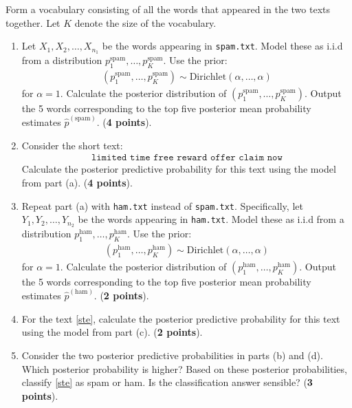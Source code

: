 \documentclass{scrartcl}
\begin{document}
\begin{enumerate}
  Form a vocabulary consisting of all the words that appeared in the
  two texts together. Let $K$ denote the size of the vocabulary. 

  \begin{enumerate}
  \item Let $X_1, X_2, \dots, X_{n_1}$ be the words appearing in
    \texttt{spam.txt}. Model these as i.i.d from a distribution
    $p^{\text{spam}}_1, \dots, p_{K}^{\text{spam}}$. Use the prior:
    \begin{align*}
      (p^{\text{spam}}_1, \dots, p_{K}^{\text{spam}}) \sim
      \text{Dirichlet}(\alpha, \dots, \alpha)
    \end{align*}
    for $\alpha = 1$. Calculate the posterior distribution of
    $(p^{\text{spam}}_1, \dots, p_{K}^{\text{spam}})$. Output the 5
    words corresponding to the top five posterior mean probability
    estimates $\hat{p}^{(\text{spam})}$. (\textbf{4 points}).
  \item Consider the short text:
    \begin{align}\label{ste}
      \texttt{ limited time free reward offer claim now  }
    \end{align}
  Calculate the posterior predictive probability for this text using
  the model from part (a). (\textbf{4 points}).
  \item Repeat part (a) with \texttt{ham.txt} instead of
    \texttt{spam.txt}. Specifically, let $Y_1, Y_2, \dots, Y_{n_2}$ be
    the words appearing in 
    \texttt{ham.txt}. Model these as i.i.d from a distribution
    $p^{\text{ham}}_1, \dots, p_{K}^{\text{ham}}$. Use the prior:
    \begin{align*}
      (p^{\text{ham}}_1, \dots, p_{K}^{\text{ham}}) \sim
      \text{Dirichlet}(\alpha, \dots, \alpha)
    \end{align*}
    for $\alpha = 1$. Calculate the posterior distribution of
    $(p^{\text{ham}}_1, \dots, p_{K}^{\text{ham}})$. Output the 5
    words corresponding to the top five posterior mean probability
    estimates $\hat{p}^{(\text{ham})}$. (\textbf{2 points}).
 \item  For the text \eqref{ste},   calculate the posterior predictive
   probability for this text using the model from part (c). (\textbf{2
     points}).
 \item Consider the two posterior predictive probabilities in parts
   (b) and    (d). Which posterior probability is higher? Based on these
   posterior probabilities, classify \eqref{ste} as spam or ham. Is
   the classification answer sensible? (\textbf{3 points}).

\end{enumerate}
\end{enumerate}
\end{document}
